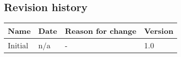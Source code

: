 \subsection{Revision history}
\begin{tabular}[t]{|l|l|l|l|}\hline
Name&Date&Reason for change&Version\\\hline\hline
Initial&n/a&-&1.0\\\hline
\end{tabular}

